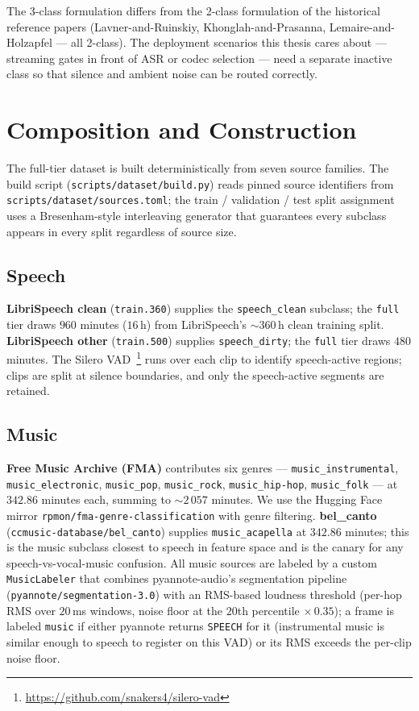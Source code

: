 The 3-class formulation differs from the 2-class formulation of the historical reference papers (Lavner-and-Ruinskiy, Khonglah-and-Prasanna, Lemaire-and-Holzapfel — all 2-class).
The deployment scenarios this thesis cares about — streaming gates in front of ASR or codec selection — need a separate inactive class so that silence and ambient noise can be routed correctly.

\section{Composition and Construction}
\label{sec:dataset_composition}

The full-tier dataset is built deterministically from seven source families.
The build script (\texttt{scripts/dataset/build.py}) reads pinned source identifiers from \texttt{scripts/dataset/sources.toml}; the train / validation / test split assignment uses a Bresenham-style interleaving generator that guarantees every subclass appears in every split regardless of source size.

\subsection*{Speech}

\textbf{LibriSpeech clean} (\texttt{train.360}) supplies the \texttt{speech\_clean} subclass; the \texttt{full} tier draws $960$ minutes ($16$\,h) from LibriSpeech's $\sim 360$\,h clean training split.
\textbf{LibriSpeech other} (\texttt{train.500}) supplies \texttt{speech\_dirty}; the \texttt{full} tier draws $480$ minutes.
The Silero VAD~\footnote{\url{https://github.com/snakers4/silero-vad}} runs over each clip to identify speech-active regions; clips are split at silence boundaries, and only the speech-active segments are retained.

\subsection*{Music}

\textbf{Free Music Archive (FMA)} contributes six genres — \texttt{music\_instrumental}, \texttt{music\_electronic}, \texttt{music\_pop}, \texttt{music\_rock}, \texttt{music\_hip-hop}, \texttt{music\_folk} — at $342.86$ minutes each, summing to $\sim 2\,057$ minutes.
We use the Hugging Face mirror \texttt{rpmon/fma-genre-classification} with genre filtering.
\textbf{bel\_canto} (\texttt{ccmusic-database/bel\_canto}) supplies \texttt{music\_acapella} at $342.86$ minutes; this is the music subclass closest to speech in feature space and is the canary for any speech-vs-vocal-music confusion.
All music sources are labeled by a custom \texttt{MusicLabeler} that combines pyannote-audio's segmentation pipeline (\texttt{pyannote/segmentation-3.0}) with an RMS-based loudness threshold (per-hop RMS over $20$\,ms windows, noise floor at the $20$th percentile $\times\,0.35$); a frame is labeled \texttt{music} if either pyannote returns \texttt{SPEECH} for it (instrumental music is similar enough to speech to register on this VAD) or its RMS exceeds the per-clip noise floor.

